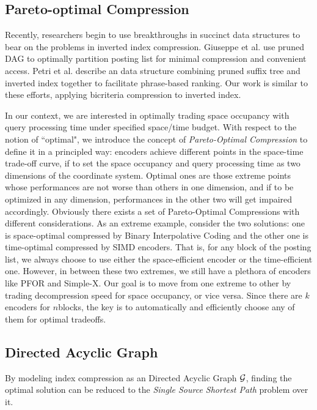 \documentclass{sig-alternate-05-2015}
\begin{document}
{\color{red}{blocks are concatenated into one graph $ \cal G $.}}

\subsection{Pareto-optimal Compression}
Recently, researchers begin to use breakthroughs in succinct data structures to bear on the problems in inverted index compression.
Giuseppe et al. \cite{ottaviano2014partitioned} use pruned DAG \cite{ferragina2011optimally} to optimally partition posting list for minimal compression and convenient access.
Petri et al. \cite{petri2014score} describe an data structure combining pruned suffix tree and inverted index together to facilitate phrase-based ranking.
Our work is similar to these efforts, applying bicriteria compression to inverted index.

In our context, we are interested in optimally trading space occupancy with query processing time under specified space/time budget.
With respect to the notion of ``optimal", we introduce the concept of \textit{Pareto-Optimal Compression} to define it in a principled way: encoders achieve different points in the space-time trade-off curve, if to set the space occupancy and query processing time as two dimensions of the coordinate system.
Optimal ones are those extreme points whose performances are not worse than others in one dimension, and if to be optimized in any dimension, performances in the other two will get impaired accordingly.
Obviously there exists a set of Pareto-Optimal Compressions with different considerations.
As an extreme example, consider the two solutions: one is space-optimal compressed by Binary Interpolative Coding \cite{moffat2000binary} and the other one is time-optimal compressed by SIMD encoders.
That is, for any block of the posting list, we always choose to use either the space-efficient encoder or the time-efficient one.
However, in between these two extremes, we still have a plethora of encoders like PFOR and Simple-X.
Our goal is to move from one extreme to other by trading decompression speed for space occupancy, or vice versa.
Since there are $ k $ encoders for $ n $blocks, the key is to automatically and efficiently choose any of them for optimal tradeoffs.

\subsection{Directed Acyclic Graph}
By modeling index compression as an Directed Acyclic Graph $ \cal G $, finding the optimal solution can be reduced to the \textit{Single Source Shortest Path} problem over it.
\end{document}
